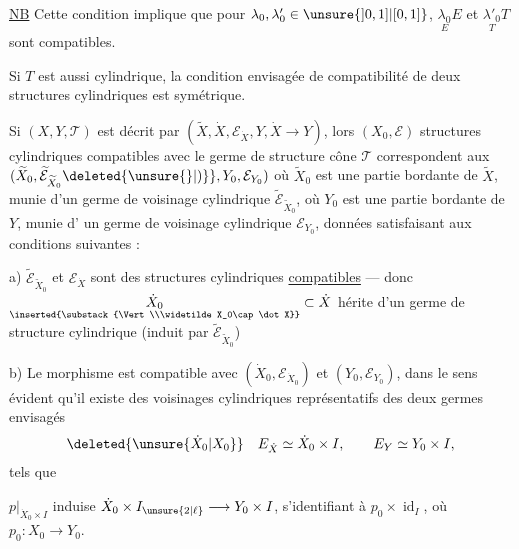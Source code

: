 \uline{NB} Cette condition implique que pour $\lambda_0,\lambda'_0\in\unsure{]0,1]|[0,1]}$,
$\underset{E}{\lambda_0}E$ et $\underset{T}{\lambda'_0}T$ sont compatibles.

Si $T$ est aussi cylindrique, la condition
envisagée de compatibilité de deux structures
cylindriques est symétrique.

Si $(X,Y,\mathcal T)$ est décrit par $(\widetilde X,\dot X,\mathcal E_{\dot X},Y,\dot X\to Y)$,
lors  $(X_0,\mathcal E)$  structures cylindriques compatibles
avec le germe de structure cône $\mathcal T$ correspondent
aux 
$(\widetilde X_0,\widetilde{\mathcal E}_{\widetilde X_0}\deleted{\unsure{\}|)}},Y_0,\mathcal E_{Y_0})$
où $\widetilde X_0$ est une partie bordante de  $\widetilde X$, munie
d'un germe de voisinage cylindrique $\widetilde{\mathcal E}_{\widetilde X_0}$,
où $Y_0$ est une partie bordante de $Y$, munie d'
un germe de  voisinage cylindrique
$\mathcal E_{Y_0}$,  données satisfaisant aux conditions
suivantes :

a) $\widetilde{\mathcal E}_{\widetilde X_0}$ et $\mathcal E_{\dot X}$ sont des
 structures cylindriques
\uline{compatibles} --- donc $\underset{\inserted{\substack{\Vert\\\widetilde X_0\cap\dot X}}}{\dot X_0}\subset\dot X$
hérite d'un
germe de structure cylindrique  (induit par
$\widetilde{\mathcal E}_{\widetilde X_0}$)

b) Le morphisme
est compatible
avec $(\dot X_0,\mathcal E_{\dot X_0})$ et $(Y_0,\mathcal E_{Y_0})$, dans le sens
évident 
qu'il existe des voisinages cylindriques
représentatifs des deux germes envisagés
\[
\deleted{\unsure{\dot X_0|X_0}}\quad
E_{\dot X}\simeq\dot X_0\times I,\qquad E_Y\simeq Y_0\times I,
\]
tels que

$p|_{\dot X_0\times I}$ induise $\dot X_0\times I_{\unsure{2|\ell}}\longrightarrow Y_0\times I$,
s'identifiant à $p_0\times\operatorname{id}_I$, où $p_0:X_0\longrightarrow Y_0$.

